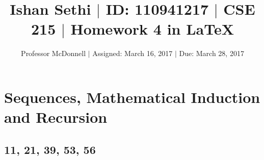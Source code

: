 \documentclass[11pt]{article}
\begin{document}
\title{\vspace{-.5in} Ishan Sethi $|$ ID: 110941217 $|$ CSE 215 $|$ Homework 4 in \LaTeX}
\author{Professor McDonnell $|$ Assigned: March 16, 2017 $|$ Due: March 28, 2017}
\date{}
\maketitle
\hrulefill
\tableofcontents

\section{Sequences, Mathematical Induction and Recursion}
\subsection{11, 21, 39, 53, 56}
\end{document}
